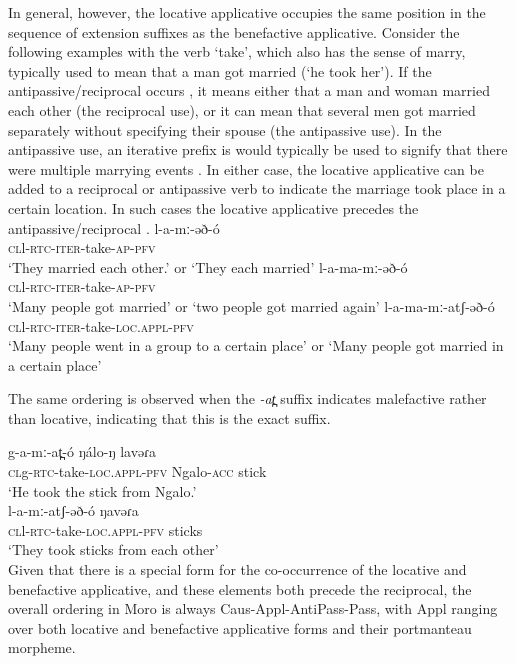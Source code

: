 In general, however, the locative applicative occupies the same position in the sequence of extension suffixes as the benefactive applicative. Consider the following examples with the verb ‘take’, which also has the sense of marry, typically used to mean that a man got married (‘he took her’). If the antipassive/reciprocal occurs , it means either that a man and woman married each other (the reciprocal use), or it can mean that several men got married separately without specifying their spouse (the antipassive use). In the antipassive use, an iterative prefix is would typically be used to signify that there were multiple marrying events . In either case, the locative applicative can be added to a reciprocal or antipassive verb to indicate the marriage took place in a certain location. In such cases the locative applicative precedes the antipassive/reciprocal .
\ea
\ea \gll	l-a-mː-əð-ó\\
		\textsc{cl}l-\textsc{rtc}-\textsc{iter}-take-\textsc{ap-\textsc{pfv}}\\
		\glt ‘They married each other.’ or ‘They each married’ \label{ex:ch11:marry1}
\ex \gll 	l-a-ma-mː-əð-ó 	\\
		\textsc{cl}l-\textsc{rtc}-\textsc{iter}-take-\textsc{ap-\textsc{pfv}}\\
 		\glt ‘Many people got married’ or ‘two people got married again’ \label{ex:ch11:marry2}
\ex \gll	l-a-ma-mː-atʃ-əð-ó 	\\
		\textsc{cl}l-\textsc{rtc}-\textsc{iter}-take-\textsc{loc.appl-\textsc{pfv}}\\
 		\glt ‘Many people went in a group to a certain place’ or \hspace{3cm} ‘Many people got married in a certain place’ \label{ex:ch11:marry3}
\z
\z

The same ordering is observed when the \textit{-at̪} suffix indicates malefactive rather than locative, indicating that this is the exact suffix.

\ea
\ea \gll g-a-mː-at̪-ó 			ŋálo-ŋ 		lavəɾa\\
\textsc{cl}g-\textsc{rtc}-take-\textsc{loc.appl-pfv}	Ngalo-\textsc{acc}	stick\\
\glt ‘He took the stick from Ngalo.’\\

\ex \gll	l-a-mː-atʃ-əð-ó 			ŋavəɾa\\
\textsc{cl}l-\textsc{rtc}-take-\textsc{loc.appl-pfv}	sticks\\
\glt ‘They took sticks from each other’\\
\z
\z
Given that there is a special form for the co-occurrence of the locative and benefactive applicative, and these elements both precede the reciprocal, the overall ordering in Moro is always Caus-Appl-AntiPass-Pass, with Appl ranging over both locative and benefactive applicative forms and their portmanteau morpheme. 

